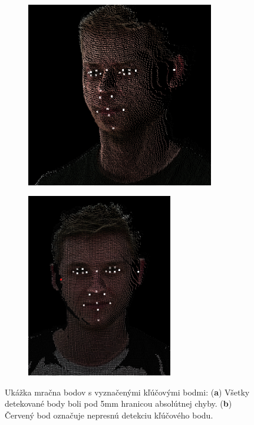 \begin{figure}[H]
	\centering
	\begin{subfigure}[b]{0.40\textwidth}
		\centering
		\includegraphics[width=0.9\textwidth]{figures/dlib_cloud_a.png}
		\caption{}
		\label{fig:dlib:cloud:a}
	\end{subfigure}
	\hskip 0.2in
	\begin{subfigure}[b]{0.39\textwidth}
		\centering
		\includegraphics[width=0.7\textwidth]{figures/dlib_cloud_b1.png}
		\caption{}
		\label{fig:dlib:cloud:b}
	\end{subfigure}
	\caption{Ukážka mračna bodov s vyznačenými kľúčovými bodmi: (\textbf{a}) Všetky detekované body boli pod 5mm hranicou absolútnej chyby. (\textbf{b}) Červený bod označuje nepresnú detekciu kľúčového bodu.}
	\label{fig:dlib:cloud}
\end{figure}

